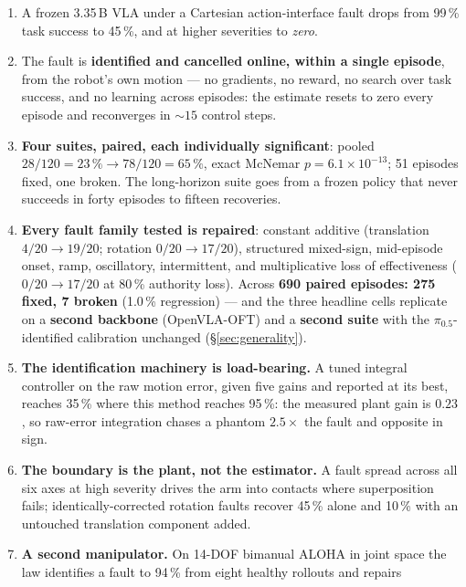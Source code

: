 \documentclass[11pt,a4paper]{article}
\begin{document}
\begin{enumerate}[leftmargin=1.6em,itemsep=3pt]
  \item A frozen 3.35\,B VLA under a Cartesian action-interface fault drops from
        99\,\% task success to 45\,\%, and at higher severities to \emph{zero}.
  \item The fault is \textbf{identified and cancelled online, within a single
        episode}, from the robot's own motion --- no gradients, no reward, no
        search over task success, and no learning across episodes: the estimate
        resets to zero every episode and reconverges in ${\sim}15$ control steps.
  \item \textbf{Four suites, paired, each individually significant}: pooled
        $28/120 = 23\,\% \to 78/120 = 65\,\%$, exact McNemar $p = 6.1\times 10^{-13}$;
        51 episodes fixed, one broken. The long-horizon suite goes from a frozen policy
        that never succeeds in forty episodes to fifteen recoveries.
  \item \textbf{Every fault family tested is repaired}: constant additive
        (translation $4/20 \to 19/20$; rotation $0/20 \to 17/20$), structured
        mixed-sign, mid-episode onset, ramp, oscillatory, intermittent, and
        multiplicative loss of effectiveness ($0/20 \to 17/20$ at 80\,\% authority
        loss). Across \textbf{690 paired episodes: 275 fixed, 7 broken}
        (1.0\,\% regression) --- and the three headline cells replicate on a
        \textbf{second backbone} (OpenVLA-OFT) and a \textbf{second suite} with the
        $\pi_{0.5}$-identified calibration unchanged (\S\ref{sec:generality}).
  \item \textbf{The identification machinery is load-bearing.} A tuned integral
        controller on the raw motion error, given five gains and reported at its
        best, reaches 35\,\% where this method reaches 95\,\%: the measured plant
        gain is $0.23$, so raw-error integration chases a phantom $2.5\times$ the
        fault and opposite in sign.
  \item \textbf{The boundary is the plant, not the estimator.} A fault spread
        across all six axes at high severity drives the arm into contacts where
        superposition fails; identically-corrected rotation faults recover 45\,\%
        alone and 10\,\% with an untouched translation component added.
  \item \textbf{A second manipulator.} On 14-DOF bimanual ALOHA in joint space the law
        identifies a fault to 94\,\% from eight healthy rollouts and repairs

\end{enumerate}
\end{document}
